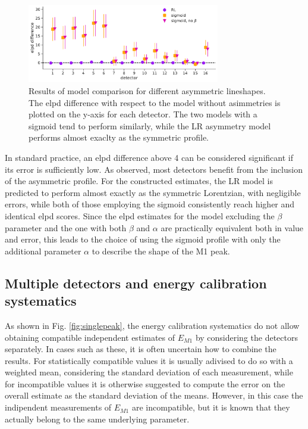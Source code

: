 \begin{figure}[t]
  \centering
  \includegraphics[width=0.75\textwidth]{figures/ch3/peaks/loooCV_0.pdf}
  \caption{Results of model comparison for different asymmetric lineshapes. The elpd difference with respect to the
  model without asimmetries is plotted on the y-axis for each detector. The two models with a sigmoid tend to
perform similarly, while the LR asymmetry model performs almost exaclty as the symmetric profile.}
  \label{fig:comp}
\end{figure}

In standard practice, an elpd difference above 4 can be considered significant if its error is sufficiently low. As
observed, most detectors benefit from the inclusion of the asymmetric profile. For the constructed estimates, the LR model is predicted to perform
almost exactly as the symmetric Lorentzian, with negligible errors, while both of those employing the sigmoid consistently reach higher and identical
elpd scores. Since the
elpd estimates for the model excluding the $\beta$ parameter and the one with both
$\beta$ and $\alpha$ are practically equivalent both in value and error, this leads
to the choice of using the sigmoid profile with only the additional parameter $\alpha$ to describe the shape of the M1
peak.






\subsection{Multiple detectors and energy calibration systematics}
As shown in Fig. \ref{fig:singlepeak}, the energy calibration systematics do not allow obtaining compatible independent estimates of $E_{M 1}$ by
considering the detectors separately. In cases such as these, it is often uncertain how to combine the results.
For statistically compatible values it is usually adivised to do so with a weighted mean, considering the standard
deviation of each measurement, while for incompatible values it is otherwise suggested to compute the error on the overall
estimate as the standard deviation of the means. However, in this case the indipendent measurements of
$E_{M 1}$ are incompatible, but it is known that they actually belong to the same underlying parameter.




